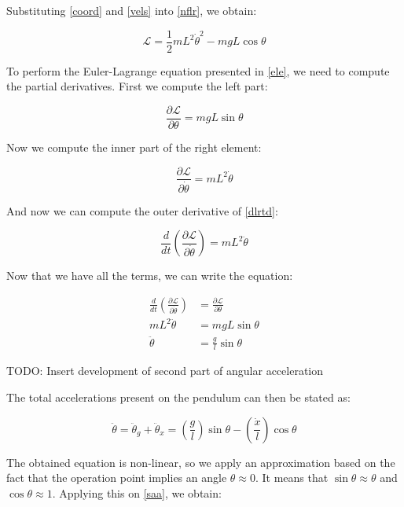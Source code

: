 Substituting \ref{coord} and \ref{vels} into \ref{nflr}, we obtain:

\begin{equation} \label{les}
	\mathcal{L}=\frac{1}{2}mL^2\dot{\theta}^2-mgL\cos{\theta}
\end{equation}

To perform the Euler-Lagrange equation presented in \ref{ele}, we need to compute the partial derivatives. First we compute the left part:

\begin{equation} \label{dlrt}
	\frac{\partial\mathcal{L}}{\partial\theta}=mgL\sin{\theta}
\end{equation}

Now we compute the inner part of the right element:

\begin{equation} \label{dlrtd}
	\frac{\partial\mathcal{L}}{\partial\dot{\theta}}=mL^2\dot{\theta}
\end{equation}

And now we can compute the outer derivative of \ref{dlrtd}:

\begin{equation} \label{dlrtt}
	\frac{d}{dt}\left( \frac{\partial\mathcal{L}}{\partial\dot{\theta}} \right)=mL^2\ddot{\theta}
\end{equation}

Now that we have all the terms, we can write the equation:

\begin{equation} \label{eles}
	\begin{split}
		\frac{d}{dt}\left( \frac{\partial\mathcal{L}}{\partial\dot{\theta}} \right)&=\frac{\partial\mathcal{L}}{\partial\theta}\\
		mL^2\ddot{\theta}&=mgL\sin{\theta}\\
		\ddot{\theta}&=\frac{g}{l}\sin{\theta}
	\end{split}
\end{equation}

TODO: Insert development of second part of angular acceleration

The total accelerations present on the pendulum can then be stated as:

\begin{equation} \label{saa}
	\ddot{\theta}=\ddot{\theta}_g+\ddot{\theta}_x=\left(\frac{g}{l}\right)\sin{\theta}-\left(\frac{\dot{x}}{l}\right)\cos{\theta}
\end{equation}

The obtained equation is non-linear, so we apply an approximation based on the fact that the operation point implies an angle $\theta\approx0$. It means that $\sin{\theta}\approx\theta$ and $\cos{\theta}\approx1$. Applying this on \ref{saa}, we obtain:

